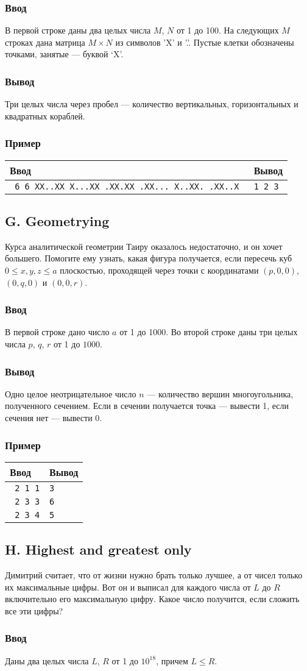 \documentclass[10pt, a4paper]{article}
\newcommand{\informat}[1]
{
	\subsubsection*{Ввод} #1
}
\newcommand{\outformat}[1]
{
	\subsubsection*{Вывод} #1
}
\newcommand{\example}[2]
{
	\subsubsection*{Пример}
	\noindent
	\begin{center}
	\begin{tabularx}{\linewidth}{|X|X|}
	\hline
	Ввод & Вывод \\
	\hline
	{\tt #1} & {\tt #2}		\\
	\hline
	\end{tabularx}
	\end{center}
}
\newcommand{\exampleee}[6]
{
	\subsubsection*{Пример}
	\noindent
	\begin{center}
	\begin{tabularx}{\linewidth}{|X|X|}
	\hline
	Ввод 	& Вывод  	\\
	\hline
	{\tt #1} & {\tt #2}	\\
	\hline
	{\tt #3} & {\tt #4}	\\
	\hline
	{\tt #5} & {\tt #6}	\\
	\hline
	\end{tabularx}
	\end{center}
}
\begin{document}
\informat{В первой строке даны два целых числа $M$, $N$ от 1 до 100. На следующих $M$ строках дана матрица $M \times N$ из символов 'X' и '.'. Пустые клетки обозначены точками, занятые --- буквой ‘X’. }

\outformat{Три целых числа через пробел --- количество вертикальных, горизонтальных и квадратных кораблей.}

\example{
6 6\newline
XX..XX\newline
X...XX\newline
.XX.XX\newline
.XX...\newline
X..XX.\newline
.XX..X
}{1 2 3}

\newpage

\subsection*{G. Geometrying}

Курса аналитической геометрии Таиру оказалось недостаточно, и он хочет большего. Помогите ему узнать, какая фигура получается, если пересечь куб $0 \leqslant x, y, z \leqslant a$ плоскостью, проходящей через точки с координатами $(p, 0, 0)$, $(0, q, 0)$ и $(0, 0, r)$.

\informat{В первой строке дано число $a$ от 1 до 1000. Во второй строке даны три целых числа $p$, $q$, $r$ от 1 до $1000$.}

\outformat{Одно целое неотрицательное число $n$ --- количество вершин многоугольника, полученного сечением. Если в сечении получается точка --- вывести 1, если сечения нет --- вывести 0.}

\exampleee{
2 \newline
1 1 1}{3}{
2\newline
3 3 3}{6}{
2 \newline
2 3 4}{5}

\newpage

\subsection*{H. Highest and greatest only}

Димитрий считает, что от жизни нужно брать только лучшее, а от чисел только их максимальные цифры. Вот он и выписал для каждого числа от $L$ до $R$ включительно его максимальную цифру. Какое число получится, если сложить все эти цифры?

\informat{Даны два целых числа $L$, $R$ от 1 до $10^{18}$, причем $L \leqslant R$.}
\end{document}
